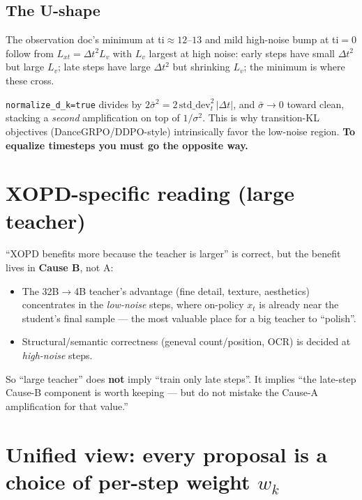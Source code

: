 \documentclass[11pt,a4paper]{article}
\newcommand{\dt}{\Delta t}
\begin{document}
\subsection{The U-shape}
\label{ssec:ushape}

The observation doc's minimum at ti$\approx12$--$13$ and mild high-noise bump at ti$=0$ follow from
$L_{xt}=\dt^2 L_v$ with $L_v$ largest at high noise: early steps have small $\dt^2$ but large $L_v$;
late steps have large $\dt^2$ but shrinking $L_v$; the minimum is where these cross.

\begin{tcolorbox}[colback=red!5,colframe=red!50!black,title=\textbf{Corollary: \texttt{normalize\_d\_k=true} makes it worse, not better}]
\texttt{normalize\_d\_k=true} divides by $2\bar\sigma^2=2\,\mathrm{std\_dev}_t^2\,\lvert\dt\rvert$,
and $\bar\sigma\to0$ toward clean, stacking a \emph{second} amplification on top of $1/\sigma^2$.
This is why transition-KL objectives (DanceGRPO/DDPO-style) intrinsically favor the low-noise
region. \textbf{To equalize timesteps you must go the opposite way.}
\end{tcolorbox}

\section{XOPD-specific reading (large teacher)}
\label{sec:xopd}

``XOPD benefits more because the teacher is larger'' is correct, but the benefit lives in
\textbf{Cause B}, not A:
\begin{itemize}[leftmargin=1.5em]
\item The 32B$\to$4B teacher's advantage (fine detail, texture, aesthetics) concentrates in the
\emph{low-noise} steps, where on-policy $x_t$ is already near the student's final sample --- the most
valuable place for a big teacher to ``polish''.
\item Structural/semantic correctness (geneval count/position, OCR) is decided at \emph{high-noise}
steps.
\end{itemize}
So ``large teacher'' does \textbf{not} imply ``train only late steps''. It implies ``the late-step
Cause-B component is worth keeping --- but do not mistake the Cause-A amplification for that value.''

\section[Unified view: per-step weighting]
{Unified view: every proposal is a choice of per-step weight $w_k$}
\label{sec:unified}
\end{document}

